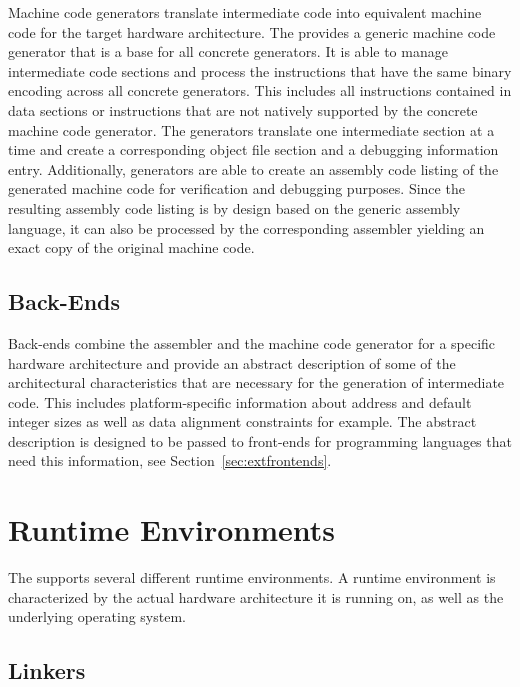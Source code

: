 Machine code generators translate intermediate code into equivalent machine code for the target hardware architecture.
The \ecs{} provides a generic machine code generator that is a base for all concrete generators.
It is able to manage intermediate code sections and process the instructions that have the same binary encoding across all concrete generators.
This includes all instructions contained in data sections or instructions that are not natively supported by the concrete machine code generator.
The generators translate one intermediate section at a time and create a corresponding object file section and a debugging information entry.
Additionally, generators are able to create an assembly code listing of the generated machine code for verification and debugging purposes.
Since the resulting assembly code listing is by design based on the generic assembly language, it can also be processed by the corresponding assembler yielding an exact copy of the original machine code.

\subsection{Back-Ends}\label{sec:extbackends}

Back-ends combine the assembler and the machine code generator for a specific hardware architecture and provide an abstract description of some of the architectural characteristics that are necessary for the generation of intermediate code.
This includes platform-specific information about address and default integer sizes as well as data alignment constraints for example.
The abstract description is designed to be passed to front-ends for programming languages that need this information, see Section~\ref{sec:extfrontends}.

\section{Runtime Environments}

The \ecs{} supports several different runtime environments.
A runtime environment is characterized by the actual hardware architecture it is running on, as well as the underlying operating system.

\subsection{Linkers}

